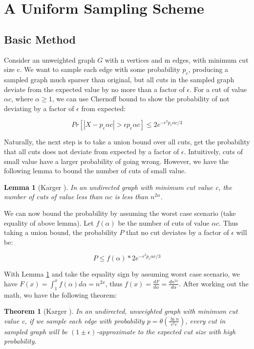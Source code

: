 \documentclass{article}
\newtheorem{theorem}{Theorem}
\newtheorem{lemma}{Lemma}
\begin{document}
\section{A Uniform Sampling Scheme}

\subsection{Basic Method}

Consider an unweighted graph $G$ with n vertices and m edges, with minimum cut size c. We want to sample each edge with some probability $p_e$, producing a sampled graph much sparser than original, but all cuts in the sampled graph deviate from the expected value by no more than a factor of $\epsilon$. For a cut of value $\alpha c$, where $\alpha \geq 1$, we can use Chernoff bound to show the probability of not deviating by a factor of $\epsilon$ from expected:

\begin{equation}
    Pr[|X - p_e\alpha c| > \epsilon p_e\alpha c] \leq 2e^{-\epsilon^2p_e\alpha c/3}
\end{equation}

Naturally, the next step is to take a union bound over all cuts, get the probability that all cuts does not deviate from expected by a factor of $\epsilon$. Intuitively, cuts of small value have a larger probability of going wrong. However, we have the following lemma to bound the number of cuts of small value. 

\begin{lemma}[Karger \cite{karger1999random}] \label{boundcuts}
In an undirected graph with minimum cut value c, the number of cuts of value less than $\alpha c$ is less than $n^{2\alpha}$.
\end{lemma}

We can now bound the probability by assuming the worst case scenario (take equality of above lemma). Let $f(\alpha)$ be the number of cuts of value $\alpha c$. Thus taking a union bound, the probability $P$ that no cut deviates by a factor of $\epsilon$ will be:

\begin{equation}
    P \leq f(\alpha) * 2e^{-\epsilon^2p_e\alpha c/3}
\end{equation}

With Lemma \ref{boundcuts} and take the equality sign by assuming worst case scenario, we have $F(x) = \int_{1}^{x} f(\alpha) d\alpha = n^{2x}$, thus $f(x) = \frac{dF}{d\alpha} = \frac{dn^{2x}}{d\alpha}$. 
After working out the math, wo have the following theorem:
\begin{theorem}[Karger \cite{karger1999random}] \label{theorem1}
In an undirected, unweighted graph with minimum cut value c, if we sample each edge with probability $p = \theta (\frac{\ln{n}}{\epsilon^2c})$, every cut in sampled graph will be $(1 \pm \epsilon)$-approximate to the expected cut size with high probability.
\end{theorem}
\end{document}
